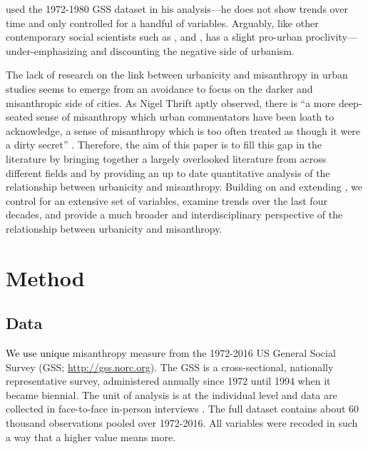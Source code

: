 \documentclass[11pt, letterpaper]{article}
\newcommand{\hilite}[1]{\textcolor{black}{#1}}
\begin{document}
\begin{spacing}{1.4}
\citet{wilson85} used the 1972-1980 GSS dataset in his analysis---he does not show trends over time and only controlled for a handful of variables.  Arguably, like other
contemporary social scientists such as \citet[][]{veenhoven94}, \citet[][]{meyer13} and \citet[][]{fischer82}, \citeauthor{wilson85} has a slight pro-urban
proclivity---under-emphasizing and discounting the negative side of urbanism.  

The lack of research on the link between urbanicity and misanthropy in urban studies
seems to emerge from an avoidance to focus on the darker and misanthropic side
of cities. As Nigel Thrift aptly observed, there is ``a more deep-seated sense of misanthropy which urban commentators have been loath to acknowledge, a sense of misanthropy which is too often treated as though it were a dirty secret'' \citep[p. 134]{thrift05}. Therefore, the aim of this paper is to fill this gap in the literature by
bringing together a largely overlooked literature from across different fields and
by providing an up to date quantitative analysis of the relationship between
urbanicity and misanthropy. Building on and extending \citet{wilson85}, we control for an extensive set of variables, examine trends over the last four decades, and provide a much broader and interdisciplinary perspective of the relationship between urbanicity and misanthropy. 



\section*{Method} 

\subsection*{Data}

\hilite{We use unique} misanthropy measure from the 1972-2016 US General Social Survey (GSS;
\url{http://gss.norc.org}). The GSS is a cross-sectional, nationally
representative survey, administered annually since 1972 until 1994 when it
became biennial. The unit of analysis is at the individual level and data are collected in face-to-face in-person interviews \citep{davis07}. The full dataset contains about 60 thousand observations pooled over 1972-2016. All variables were recoded in such a way that a higher value means more. 


\end{spacing}
\end{document}
